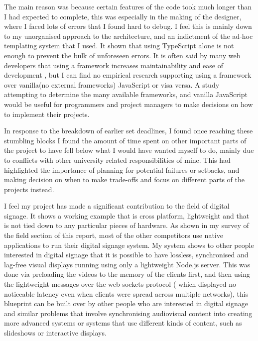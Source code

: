 \documentclass{article}
\begin{document}
The main reason was because certain features of the code took much longer than I had expected to complete, this was especially in the making of the designer, where I faced lots of errors that I found hard to debug. I feel this is mainly down to my unorganised approach to the architecture, and an indictment of the ad-hoc templating system that I used. It shown that using TypeScript alone is not enough to prevent the bulk of unforeseen errors. It is often said by many web developers that using a framework increases maintainability and ease of development \cite{shadow_dom}, but I can find no empirical research supporting using a framework over vanilla(no external frameworks) JavaScript or visa versa. A study attempting to determine the many available frameworks, and vanilla JavaScript would be useful for programmers and project managers to make decisions on how to implement their projects.

In response to the breakdown of earlier set deadlines, I found once reaching these stumbling blocks I found the amount of time spent on other important parts of the project to have fell below what I would have wanted myself to do, mainly due to conflicts with other university related responsibilities of mine. This had highlighted the importance of planning for potential failures or setbacks, and making decision on when to make trade-offs and focus on different parts of the projects instead.

I feel my project has made a significant contribution to the field of digital signage. It shows a working example that is cross platform, lightweight and that is not tied down to any particular pieces of hardware. As shown in my survey of the field section of this report, most of the other competitors use native applications to run their digital signage system.  My system shows to other people interested in digital signage that it is possible to have lossless, synchronised and lag-free visual displays running using only a lightweight Node.js server. This was done via preloading the videos to the memory of the clients first, and then using the lightweight messages over the  web sockets protocol ( which displayed no noticeable latency even when clients were spread across multiple networks),  this blueprint can be built over by other people who are interested in digital signage and similar problems that involve synchronising audiovisual content into creating more advanced systems or systems that use different kinds of content, such as slideshows or interactive displays. 
\end{document}
